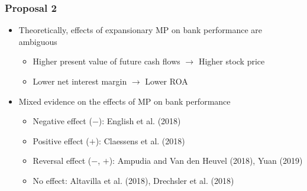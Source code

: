 \documentclass[12pt, aspectratio=169, xcolor=dvipsnames]{beamer} 			         %
\begin{document}
\begin{frame}
	\frametitle{Proposal 2}
	\begin{itemize}
		\item Theoretically, effects of expansionary MP on bank performance are ambiguous
		\begin{itemize}
			\item Higher present value of future cash flows $\rightarrow$ Higher stock price
			\item Lower net interest margin $\rightarrow$ Lower ROA
		\end{itemize}
		\item Mixed evidence on the effects of MP on bank performance
		\begin{itemize}
			\item Negative effect ($-$): English et al. (2018)
			\item Positive effect ($+$): Claessens et al. (2018)
			\item Reversal effect ($-$, $+$): Ampudia and Van den Heuvel (2018), Yuan (2019)
			\item No effect: Altavilla et al. (2018), Drechsler et al. (2018)
		\end{itemize}
	\end{itemize}
\end{frame}
\end{document}
